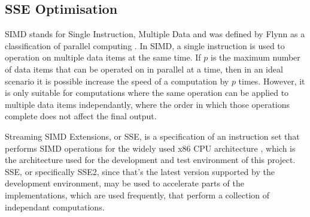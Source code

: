 \subsection{SSE Optimisation}
\label{sec:sse}

SIMD stands for Single Instruction, Multiple Data and was defined by Flynn as a classification of parallel computing \cite{flynns-taxonomy}. In SIMD, a single instruction is used to operation on multiple data items at the same time. If $p$ is the maximum number of data items that can be operated on in parallel at a time, then in an ideal scenario it is possible increase the speed of a computation by $p$ times. However, it is only suitable for computations where the same operation can be applied to multiple data items independantly, where the order in which those operations complete does not affect the final output.

Streaming SIMD Extensions, or SSE, is a specification of an instruction set that performs SIMD operations for the widely used x86 CPU architecture \cite{sse}, which is the architecture used for the development and test environment of this project. SSE, or specifically SSE2, since that's the latest version supported by the development environment, may be used to accelerate parts of the implementations, which are used frequently, that perform a collection of independant computations.